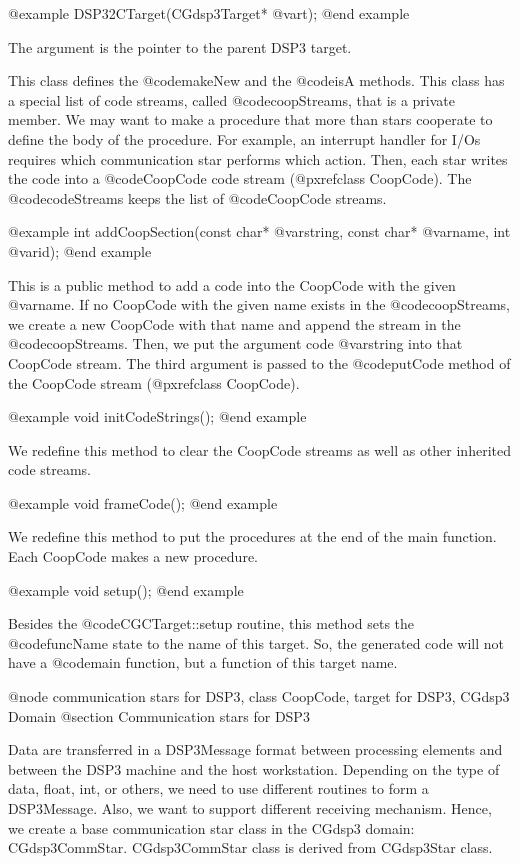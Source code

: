 {@example
DSP32CTarget(CGdsp3Target* @var{t});
@end example

The argument is the pointer to the parent DSP3 target.

This class defines the @code{makeNew} and the @code{isA} methods.
This class has a special list of code streams, called @code{coopStreams},
that is a private member. We may want to make a procedure that more than
stars cooperate to define the body of the procedure. For example, an
interrupt handler for I/Os requires which communication star
performs which action. Then, each star writes the code into a @code{CoopCode}
code stream (@pxref{class CoopCode}). The @code{codeStreams} keeps the
list of @code{CoopCode} streams.

@example
int addCoopSection(const char* @var{string}, const char* @var{name}, int @var{id});
@end example

This is a public method to add a code into the CoopCode with the given
@var{name}. If no CoopCode with the given name exists in the
@code{coopStreams}, we create a new CoopCode with that name and append the
stream in the @code{coopStreams}. Then, we put the argument code
@var{string} into that CoopCode stream. The third argument is passed to
the @code{putCode} method of the CoopCode stream (@pxref{class CoopCode}).

@example
void initCodeStrings();
@end example

We redefine this method to clear the CoopCode streams as well as other
inherited code streams.

@example
void frameCode();
@end example

We redefine this method to put the procedures at the end of
the main function. Each CoopCode makes a new procedure.

@example
void setup();
@end example

Besides the @code{CGCTarget::setup} routine, this method sets the
@code{funcName} state to the name of this target. So, the generated
code will not have a @code{main} function, but a function of this
target name.

@node communication stars for DSP3, class CoopCode, target for DSP3, CGdsp3 Domain
@section Communication stars for DSP3

Data are transferred in a DSP3Message format between processing elements and
between the DSP3 machine and the host workstation. Depending on the type of
data, float, int, or others, we need to use different routines to form
a DSP3Message. Also, we want to support different receiving mechanism.
Hence, we create a base communication star class in the CGdsp3 domain:
CGdsp3CommStar. CGdsp3CommStar class is derived from CGdsp3Star class.

}
